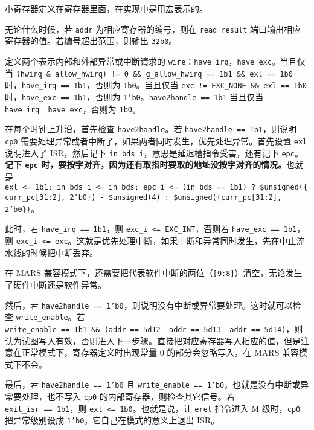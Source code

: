 \documentclass[12pt,AutoFakeBold,AutoFakeSlant]{article}
\newcommand{\ms}[1]{\texttt{#1}}
\begin{document}
小寄存器定义在寄存器里面，在实现中是用宏表示的。

无论什么时候，若 \texttt{addr} 为相应寄存器的编号，则在
\texttt{read\_result} 端口输出相应寄存器的值。若编号超出范围，则输出
\texttt{32\textquotesingle{}b0}。

定义两个表示内部和外部异常或中断请求的
\texttt{wire}：\texttt{have\_irq}，\texttt{have\_exc}。当且仅当
\texttt{(hwirq\ \&\ allow\_hwirq)\ !=\ 0\ \&\&\ g\_allow\_hwirq\ ==\ 1\textquotesingle{}b1\ \&\&\ exl\ ==\ 1\textquotesingle{}b0}
时，\texttt{have\_irq\ ==\ 1\textquotesingle{}b1}，否则为
\texttt{1\textquotesingle{}b0}。当且仅当
\texttt{exc\ !=\ EXC\_NONE\ \&\&\ exl\ ==\ 1\textquotesingle{}b0}
时，\texttt{have\_exc\ ==\ 1\textquotesingle{}b1}，否则为
\ms{1'b0}。\texttt{have2handle\ ==\ 1\textquotesingle{}b1} 当且仅当
\texttt{have\_irq\ \textbar{}\textbar{}\ have\_exc}，否则为
\texttt{1\textquotesingle{}b0}。

在每个时钟上升沿，首先检查 \texttt{have2handle}。若
\texttt{have2handle\ ==\ 1\textquotesingle{}b1}，则说明 \ms{cp0} 需要处理异常或者中断了，如果两者同时发生，优先处理异常。首先设置 \ms{exl} 说明进入了 ISR，然后记下 \ms{in\_bds\_i}，意思是延迟槽指令受害，还有记下 \ms{epc}。\textbf{记下 \ms{epc} 时，要按字对齐，因为还有取指时要取的地址没按字对齐的情况。}也就是
\texttt{exl\ \textless{}=\ 1\textquotesingle{}b1;\ in\_bds\_i\ \textless{}=\ in\_bds;\ epc\_i\ \textless{}=\ (in\_bds\ ==\ 1\textquotesingle{}b1)\ ?\ \$unsigned(\{curr\_pc[31:2], 2'b0\})\ -\ \$unsigned(4)\ :\ \$unsigned(\{curr\_pc[31:2], 2'b0\})}。

此时，若
\texttt{have\_irq\ ==\ 1\textquotesingle{}b1}，则
\texttt{exc\_i\ \textless{}=\ EXC\_INT}，否则若
\texttt{have\_exc\ ==\ 1\textquotesingle{}b1}，则
\texttt{exc\_i\ \textless{}=\ exc}。这就是优先处理中断，如果中断和异常同时发生，先在中止流水线的时候把中断丢弃。

在 MARS
兼容模式下，还需要把代表软件中断的两位（\texttt{{[}9:8{]}}）清空，无论发生了硬件中断还是软件异常。

然后，若 \ms{have2handle == 1'b0}，则说明没有中断或异常要处理。这时就可以检查
\texttt{write\_enable}。若
\texttt{write\_enable\ ==\ 1\textquotesingle{}b1\ \&\&\ (addr\ ==\ 5\textquotesingle{}d12\ \textbar{}\textbar{}\ addr\ ==\ 5\textquotesingle{}d13\ \textbar{}\textbar{}\ addr\ ==\ 5\textquotesingle{}d14)}，则认为试图写入有效，否则进入下一步骤。直接把对应寄存器写入相应的值，但是注意在正常模式下，寄存器定义时出现常量 0 的部分会忽略写入，在 MARS 兼容模式下不会。

最后，若 \ms{have2handle == 1'b0} 且 \ms{write\_enable == 1'b0}，也就是没有中断或异常要处理，也不写入 \ms{cp0} 的内部寄存器，则检查其它信号。若 \texttt{exit\_isr\ ==\ 1\textquotesingle{}b1}，则
\texttt{exl\ \textless{}=\ 1\textquotesingle{}b0}。也就是说，让 \ms{eret} 指令进入 M 级时，\ms{cp0} 把异常级别设成 \ms{1'b0}，它自己在模式的意义上退出 ISR。
\end{document}
